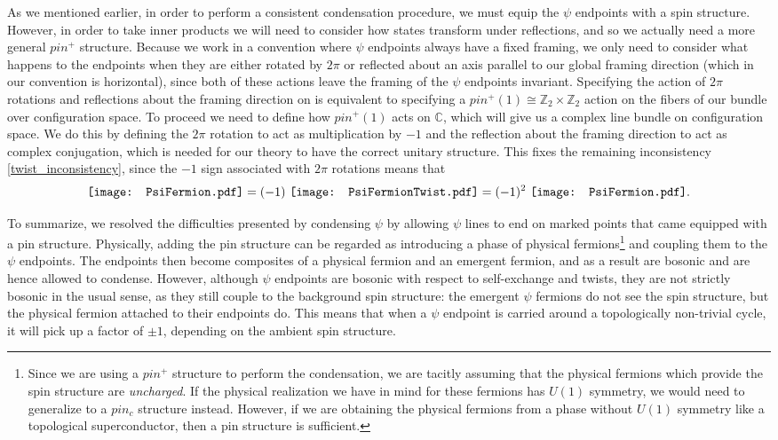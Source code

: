 \documentclass[12pt,a4paper]{article}
\newcommand{\cc}{\mathbb{C}}
\newcommand{\zt}{\mathbb{Z}_2}
\newcommand{\PsiFermion}{\mathord{\vcenter{\hbox{\texttt{[image: PsiFermion.pdf]}}}}}
\newcommand{\PsiFermionTwist}{\mathord{\vcenter{\hbox{\texttt{[image: PsiFermionTwist.pdf]}}}}}
\begin{document}
As we mentioned earlier, in order to perform a consistent condensation procedure, we must equip the $\psi$ endpoints with a spin structure. However, in order to take inner products we will need to consider how states transform under reflections, and so we actually need a more general $pin^+$ structure. Because we work in a convention where $\psi$ endpoints always have a fixed framing, we only need to consider what happens to the endpoints when they are either rotated by $2\pi$ or reflected about an axis parallel to our global framing direction (which in our convention is horizontal), since both of these actions leave the framing of the $\psi$ endpoints invariant. Specifying the action of $2\pi$ rotations and reflections about the framing direction on is equivalent to specifying a $pin^+(1) \cong \zt \times \zt$ action on the fibers of our bundle over configuration space. To proceed we need to define how $pin^+(1)$ acts on $\cc$, which will give us a complex line bundle on configuration space. We do this by defining the $2\pi$ rotation to act as multiplication by $-1$ and the reflection about the framing direction to act as complex conjugation, which is needed for our theory to have the correct unitary structure. This fixes the remaining inconsistency \eqref{twist_inconsistency}, since the $-1$ sign associated with $2\pi$ rotations means that 
\begin{align} \label{boxspin}
\PsiFermion = (-1)\ \PsiFermionTwist = (-1)^2\ \PsiFermion. 
\end{align}

To summarize, we resolved the difficulties presented by condensing $\psi$ by allowing $\psi$ lines to end on marked points that came equipped with a pin structure. Physically, adding the pin structure can be regarded as introducing a phase of physical fermions\footnote{Since we are using a $pin^+$ structure to perform the condensation, we are tacitly assuming that the physical fermions which provide the spin structure are {\it uncharged}. If the physical realization we have in mind for these fermions has $U(1)$ symmetry, we would need to generalize to a $pin_c$ structure instead. However, if we are obtaining the physical fermions from a phase without $U(1)$ symmetry like a topological superconductor, then a pin structure is sufficient. %
} 
and coupling them to the $\psi$ endpoints. The endpoints then become composites of a physical fermion and an emergent fermion, and as a result are bosonic and are hence allowed to condense. However, although $\psi$ endpoints are bosonic with respect to self-exchange and twists, they are not strictly bosonic in the usual sense, as they still couple to the background spin structure: the emergent $\psi$ fermions do not see the spin structure, but the physical fermion attached to their endpoints do. This means that when a $\psi$ endpoint is carried around a topologically non-trivial cycle, it will pick up a factor of $\pm1$, depending on the ambient spin structure. 
\end{document}
